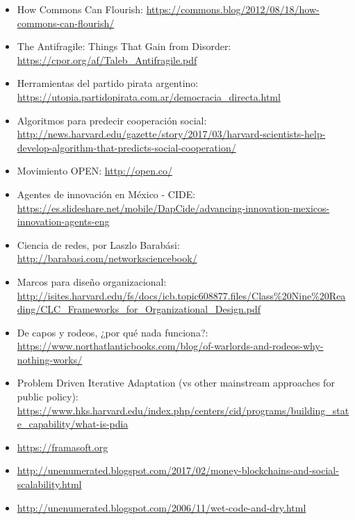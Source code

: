 \begin{itemize}
	\item How Commons Can Flourish: \url{https://commons.blog/2012/08/18/how-commons-can-flourish/}
	\item The Antifragile: Things That Gain from Disorder: \url{https://cpor.org/af/Taleb\_Antifragile.pdf}
	\item Herramientas del partido pirata argentino: \url{https://utopia.partidopirata.com.ar/democracia\_directa.html}
	\item Algoritmos para predecir cooperación social: \url{http://news.harvard.edu/gazette/story/2017/03/harvard-scientists-help-develop-algorithm-that-predicts-social-cooperation/}
	\item Movimiento OPEN: \url{http://open.co/}
	\item Agentes de innovación en México - CIDE: \url{https://es.slideshare.net/mobile/DapCide/advancing-innovation-mexicos-innovation-agents-eng}
	\item Ciencia de redes, por Laszlo Barabási: \url{http://barabasi.com/networksciencebook/}
	\item Marcos para diseño organizacional: \url{http://isites.harvard.edu/fs/docs/icb.topic608877.files/Class\%20Nine\%20Reading/CLC\_Frameworks\_for\_Organizational\_Design.pdf}
	\item De capos y rodeos, ¿por qué nada funciona?: \url{https://www.northatlanticbooks.com/blog/of-warlords-and-rodeos-why-nothing-works/}
	\item Problem Driven Iterative Adaptation (vs other mainstream approaches for public policy): \url{https://www.hks.harvard.edu/index.php/centers/cid/programs/building\_state\_capability/what-is-pdia}
	\item \url{https://framasoft.org}
	\item \url{http://unenumerated.blogspot.com/2017/02/money-blockchains-and-social-scalability.html}
	\item \url{http://unenumerated.blogspot.com/2006/11/wet-code-and-dry.html}
\end{itemize}
